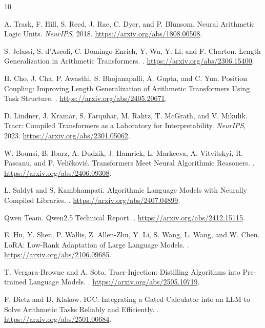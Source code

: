 \documentclass[11pt]{article}
\begin{document}
\begin{thebibliography}{10}

A. Trask, F. Hill, S. Reed, J. Rae, C. Dyer, and P. Blunsom.
\newblock Neural Arithmetic Logic Units.
\newblock \emph{NeurIPS}, 2018.
\newblock \url{https://arxiv.org/abs/1808.00508}.

S. Jelassi, S. d'Ascoli, C. Domingo-Enrich, Y. Wu, Y. Li, and F. Charton.
\newblock Length Generalization in Arithmetic Transformers.
.
\newblock \url{https://arxiv.org/abs/2306.15400}.

H. Cho, J. Cha, P. Awasthi, S. Bhojanapalli, A. Gupta, and C. Yun.
\newblock Position Coupling: Improving Length Generalization of Arithmetic
Transformers Using Task Structure.
.
\newblock \url{https://arxiv.org/abs/2405.20671}.

D. Lindner, J. Kramar, S. Farquhar, M. Rahtz, T. McGrath, and V. Mikulik.
\newblock Tracr: Compiled Transformers as a Laboratory for Interpretability.
\newblock \emph{NeurIPS}, 2023.
\newblock \url{https://arxiv.org/abs/2301.05062}.

W. Bounsi, B. Ibarz, A. Dudzik, J. Hamrick, L. Markeeva, A. Vitvitskyi,
R. Pascanu, and P. Veli\v{c}kovi\'{c}.
\newblock Transformers Meet Neural Algorithmic Reasoners.
.
\newblock \url{https://arxiv.org/abs/2406.09308}.

L. Saldyt and S. Kambhampati.
\newblock Algorithmic Language Models with Neurally Compiled Libraries.
.
\newblock \url{https://arxiv.org/abs/2407.04899}.

Qwen Team.
\newblock Qwen2.5 Technical Report.
.
\newblock \url{https://arxiv.org/abs/2412.15115}.

E. Hu, Y. Shen, P. Wallis, Z. Allen-Zhu, Y. Li, S. Wang, L. Wang, and W. Chen.
\newblock LoRA: Low-Rank Adaptation of Large Language Models.
.
\newblock \url{https://arxiv.org/abs/2106.09685}.

T. Vergara-Browne and A. Soto.
\newblock Tracr-Injection: Distilling Algorithms into Pre-trained Language
Models.
.
\newblock \url{https://arxiv.org/abs/2505.10719}.

F. Dietz and D. Klakow.
\newblock IGC: Integrating a Gated Calculator into an LLM to Solve Arithmetic
Tasks Reliably and Efficiently.
.
\newblock \url{https://arxiv.org/abs/2501.00684}.

\end{thebibliography}
\end{document}

